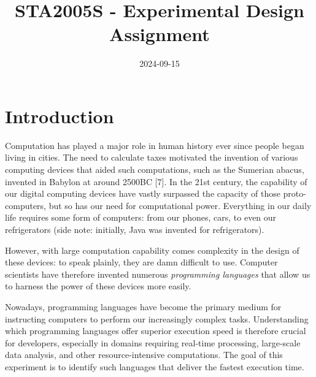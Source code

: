 \documentclass[12pt,halfline,a4paper,]{ouparticle}
\begin{document}
\title{STA2005S - Experimental Design Assignment}

\author{%
%
%
%
%
%
%
%
%
%
\and
{}
%
%
%
%
%
%
}

\abstract{}

\date{2024-09-15}

\keywords{}

\maketitle



\newpage 
\tableofcontents 
\listoffigures
\listoftables
\newpage

\newpage

\hypertarget{introduction}{%
\section{Introduction}\label{introduction}}

Computation has played a major role in human history ever since people
began living in cities. The need to calculate taxes motivated the
invention of various computing devices that aided such computations,
such as the Sumerian abacus, invented in Babylon at around 2500BC
{[}7{]}. In the 21st century, the capability of our digital computing
devices have vastly surpassed the capacity of those proto-computers, but
so has our need for computational power. Everything in our daily life
requires some form of computers: from our phones, cars, to even our
refrigerators (side note: initially, Java was invented for
refrigerators).

However, with large computation capability comes complexity in the
design of these devices: to speak plainly, they are damn difficult to
use. Computer scientists have therefore invented numerous
\emph{programming languages} that allow us to harness the power of these
devices more easily.

Nowadays, programming languages have become the primary medium for
instructing computers to perform our increasingly complex tasks.
Understanding which programming languages offer superior execution speed
is therefore crucial for developers, especially in domains requiring
real-time processing, large-scale data analysis, and other
resource-intensive computations. The goal of this experiment is to
identify such languages that deliver the fastest execution time.
\end{document}
